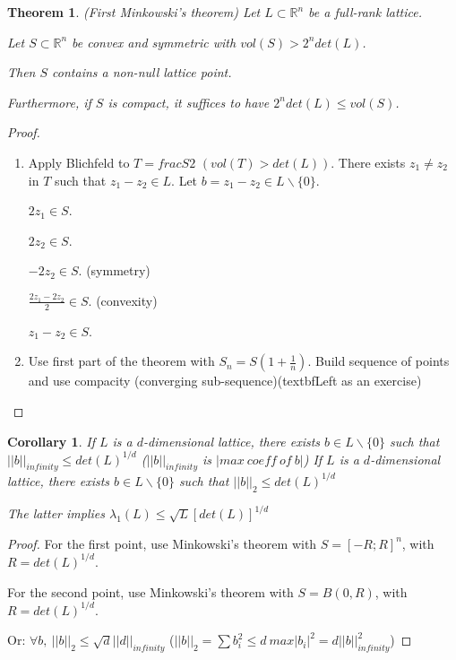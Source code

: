 \documentclass[a4paper,10pt]{article}
\newtheorem{theorem}{Theorem}
\newtheorem{corollary}{Corollary}
\begin{document}
\begin{theorem} (First Minkowski's theorem)
Let $L \subset \mathbb{R}^n$ be a full-rank lattice.

Let $S \subset \mathbb{R}^n$ be convex and symmetric with $vol(S)>2^n det(L)$.

Then $S$ contains a non-null lattice point.

Furthermore, if $S$ is compact, it suffices to have $2^n det(L) \leq vol(S)$.
\end{theorem}

\begin{proof}
\begin{enumerate}
\item Apply Blichfeld to $T=frac{S}{2}$ $(vol(T)>det(L))$. There exists $z_1 \neq z_2$ in $T$ such that $z_1-z_2 \in L$. Let $b=z_1-z_2 \in L \backslash \{ 0 \}$.

$2 z_1 \in S$. 

$2 z_2 \in S$. 

$-2 z_2 \in S$. (symmetry) 

$\frac{2 z_1 - 2 z_2}{2} \in S$. (convexity) 

$z_1-z_2 \in S$.

\item Use first part of the theorem with $S_n = S (1+ \frac{1}{n})$. Build sequence of points and use compacity (converging sub-sequence)(textbf{Left as an exercise})
\end{enumerate}
\end{proof}

\begin{corollary}
If $L$ is a $d$-dimensional lattice, there exists $b \in L \backslash \{ 0 \}$ such that $||b||_{ infinity} \leq det(L)^{1/d}$ ($||b||_{infinity}$ is $|max \ coeff \ of \ b|$)
If $L$ is a $d$-dimensional lattice, there exists $b \in L \backslash \{ 0 \}$ such that $||b||_2 \leq det(L)^{1/d}$

The latter implies $\lambda_1 (L) \leq \sqrt{L}[det(L)]^{1/d}$
\end{corollary}

\begin{proof}
For the first point, use Minkowski's theorem with $S=[-R;R]^n$, with $R=det(L)^{1/d}$.

For the second point, use Minkowski's theorem with $S=B(0,R)$, with $R=det(L)^{1/d}$.

Or: $\forall b, \ ||b||_2 \leq \sqrt{d} ||d||_{infinity}$ ($||b||_2 = \sum b_i^2 \leq d \ max |b_i|^2 = d ||b||_{infinity}^2$)
\end{proof}
\end{document}
